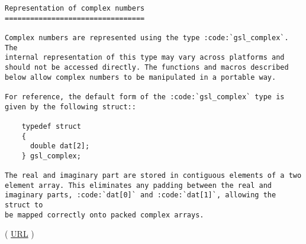 \begin{lstlisting}
Representation of complex numbers
=================================

Complex numbers are represented using the type :code:`gsl_complex`. The
internal representation of this type may vary across platforms and
should not be accessed directly. The functions and macros described
below allow complex numbers to be manipulated in a portable way.

For reference, the default form of the :code:`gsl_complex` type is
given by the following struct::

    typedef struct
    {
      double dat[2];
    } gsl_complex;

The real and imaginary part are stored in contiguous elements of a two
element array. This eliminates any padding between the real and
imaginary parts, :code:`dat[0]` and :code:`dat[1]`, allowing the struct to
be mapped correctly onto packed complex arrays.
\end{lstlisting}
( \href{https://www.gnu.org/software/gsl/doc/html/complex.html#representation-of-complex-numbers}{URL} )
\fi

